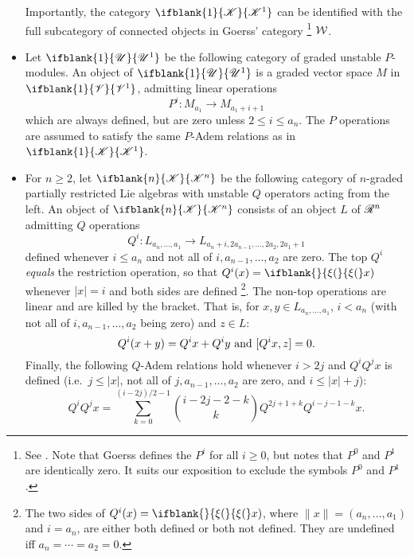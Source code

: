\documentclass[10pt]{article}
\newcommand{\GoodLie}[1]{\mathsf{g}{\scrL}^{#1}}%
\newcommand{\PRLie}[1]{\scrR^{#1}}%
\newcommand{\LL}[1]{\ifblank{#1}{\scrK}{\scrK^{#1}}}
\newcommand{\GR}[1]{\ifblank{#1}{\scrV}{\scrV^{#1}}}
\newcommand{\nontop}[1]{\ifblank{#1}{\scrU}{\scrU^{#1}}}
\newcommand{\restn}[2][]{\ifblank{#1}{\xi{#2}}{\xi_{#1}{#2}}}%
\renewcommand{\Q}{Q}
\begin{document}
\begin{CategoriesOfInterest}
\begin{itemize}
Importantly, the category $\LL{1}$ can be identified with the full subcategory of connected objects in Goerss' category%
\footnote{See \cite[p.14]{MR1089001}. Note that Goerss defines the $P^i$ for all $i\geq0$, but notes that $P^0$ and $P^1$ are identically zero. It suits our exposition to exclude the symbols $P^0$ and $P^1$.} $\mathcal{W}$.  

\item Let $\nontop{1}$ be the following category of graded unstable $P$-modules. An object of $\nontop{1}$ is a graded vector space $M$ in $\GR{1}$,
admitting linear operations
\[P^i:M_{a_1}\to M_{a_1+i+1}\]
which are always defined, but are zero unless $2\leq i\leq a_n$.
The $P$ operations are assumed to satisfy the same $P$-Adem relations as in $\LL{1}$. %
\item For $n\geq2$, let $\LL{n}$ be the following category of $n$-graded partially restricted Lie algebras with unstable $\Q$ operators acting from the left. An object of $\LL{n}$ consists of an object $L$ of $\PRLie{n}$ 
admitting $\Q$ operations
\[\Q^i:L_{a_n,\ldots,a_1}\to L_{a_n+i,2a_{n-1},\ldots,2a_2,2a_1+1}\]
defined whenever $i\leq a_n$ and not all of $i,a_{n-1},\ldots,a_{2}$ are zero. The top $\Q^i$ \emph{equals} the restriction operation, so that $\Q^{i}(x)=\restn(x)$ whenever $|x|=i$ and both sides are defined%
\footnote{The two sides of $\Q^{i}(x)=\restn(x)$, where $\|x\|=(a_n,\ldots,a_1)$ and $i=a_n$, are either both defined or both not defined. They  are undefined iff $a_n\!=\!\cdots \!=\!a_2\!=\!0$.}. The non-top operations are linear and are killed by the bracket.
That is, for $x,y\in L_{a_n,\ldots,a_1}$, $i<a_n$ (with not all of $i,a_{n-1},\ldots,a_{2}$ being zero) and $z\in L$: \[\Q^i{(x+y)}=\Q^i{x}+\Q^i{y}\textup{ and }[\Q^i{x},z]=0.\]
Finally, the following $\Q$-Adem relations hold whenever $i>2j$ and $\Q^i\Q^jx$ is defined (i.e.\ $j\leq|x|$, not all of $j,a_{n-1},\ldots,a_2$ are zero, and $i\leq|x|+j$):
\[\Q^i\Q^jx=\sum_{k=0}^{(i-2j)/2-1}{i-2j-2-k\choose k}\Q^{2j+1+k}\Q^{i-j-1-k}x.\]

\end{itemize}
\end{CategoriesOfInterest}
\end{document}
